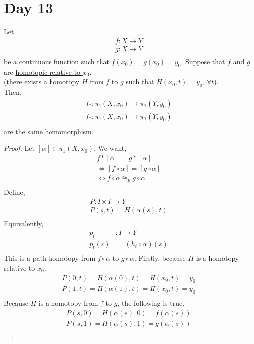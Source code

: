 \documentclass[../notes.tex]{subfiles}
\begin{document}
\section{Day 13}
    \begin{theorem} 
        Let
        \begin{align*}
            f: X\rightarrow Y\\
            g: X\rightarrow Y\\
        \end{align*}
        be a continuous function such that $f(x_0)=g(x_0)=y_0$. Suppose that
        $f$ and $g$ are \underline{homotopic relative to $x_0$}.\\(there exists a homotopy
        $H$ from $f$ to $g$ such that $H(x_0, t)=y_0,\ \forall t$).\\
        Then,
        \begin{align*}
            f_*:\pi_1(X,x_0)\rightarrow \pi_1(Y,y_0)\\
            f_*:\pi_1(X,x_0)\rightarrow \pi_1(Y,y_0)\\
        \end{align*}
        are the same homomorphism.
    \end{theorem} 
    \begin{proof}
        Let $[\alpha]\in \pi_1(X,x_0)$. We want,
        \begin{align*}
            f*[\alpha]=g*[\alpha]\\
            \iff [f\circ \alpha]=[g\circ \alpha]\\
            \iff f\circ \alpha \cong_{p} g\circ\alpha\\
        \end{align*}
        Define,
        \begin{align*}
            P: I\times I \rightarrow Y\\
            P(s,t)=H(\alpha(s), t)\\
        \end{align*}
        Equivalently, 
        \begin{align*}
            p_t&: I \rightarrow Y\\
            p_t(s)&=(h_t\circ \alpha)(s)\\
        \end{align*}
        This is a path homotopy from $f\circ \alpha$ to $g\circ\alpha$.
        Firstly, because $H$ is a homotopy relative to $x_0$.
        \begin{align*}
            P(0,t)=H(\alpha(0),t)=H(x_0,t)=y_0\\
            P(1,t)=H(\alpha(1),t)=H(x_0,t)=y_0\\
        \end{align*}
        Because $H$ is a homotopy from $f$ to $g$, the following is true.
        \begin{align*}
            P(s,0)=H(\alpha(s),0)=f(\alpha(s))\\
            P(s,1)=H(\alpha(s),1)=g(\alpha(s))\\
        \end{align*}
    \end{proof}
\end{document}
